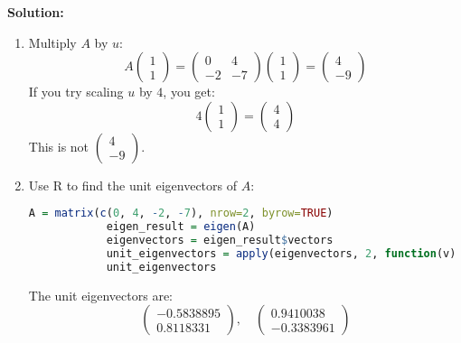 \documentclass[12pt]{article}
\newenvironment{solution}{
    \textbf{Solution:}
    
}{
    
    \vspace{2em}
}
\begin{document}
\begin{solution}
    \begin{enumerate}[label=(\alph*)]
        \item Multiply $A$ by $u$:
        \[
            A \begin{pmatrix}
                1 \\
                1
            \end{pmatrix} = \begin{pmatrix}
                0 & 4 \\
                -2 & -7
            \end{pmatrix} \begin{pmatrix}
                1 \\
                1
            \end{pmatrix} = \begin{pmatrix}
                4 \\
                -9
            \end{pmatrix}
        \]
        If you try scaling $u$ by \(4\), you get:
        \[
        4 \begin{pmatrix}
                1 \\
                1
            \end{pmatrix} = \begin{pmatrix}
                4 \\
                4
            \end{pmatrix}
        \]
        This is not \(\begin{pmatrix}
                4 \\
                -9
            \end{pmatrix}
        \).
        \item Use R to find the unit eigenvectors of $A$:
        \begin{lstlisting}[language=R]
            A = matrix(c(0, 4, -2, -7), nrow=2, byrow=TRUE)
            eigen_result = eigen(A)
            eigenvectors = eigen_result$vectors
            unit_eigenvectors = apply(eigenvectors, 2, function(v) v / sqrt(sum(v^2)))
            unit_eigenvectors
        \end{lstlisting}
        The unit eigenvectors are:
        \[
            \begin{pmatrix}
                -0.5838895 \\
                0.8118331
            \end{pmatrix}, \quad
            \begin{pmatrix}
                0.9410038 \\
                -0.3383961
            \end{pmatrix}
        \]
    \end{enumerate}
\end{solution}
\end{document}
